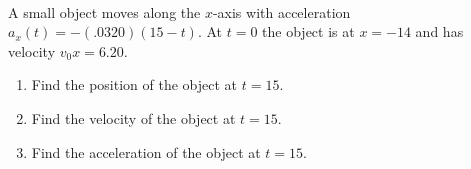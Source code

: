 \begin{exercise}\,\\
    A small object moves along the $x$-axis with acceleration $a_x(t)=-(.0320)(15-t)$. At $t=0$ the object is at $x=-14$ and has velocity $v_0x=6.20$.

    \begin{enumerate}
        \item Find the position of the object at $t=15$.
        \item Find the velocity of the object at $t=15$.
        \item Find the acceleration of the object at $t=15$.
    \end{enumerate}
\end{exercise}

